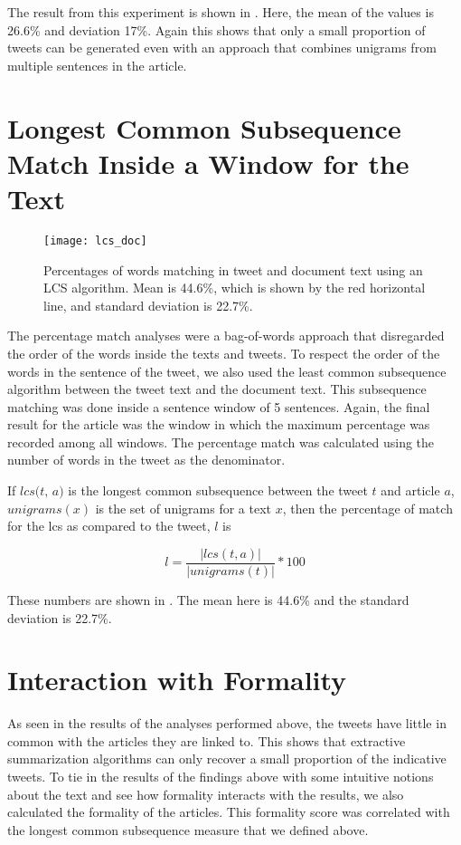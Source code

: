 The result from this experiment is shown in . Here, the mean of the values is 26.6\% and deviation 17\%. Again this shows that only a small proportion of tweets can be generated even with an approach that combines unigrams from multiple sentences in the article.


\section{Longest Common Subsequence Match Inside a Window for the Text}
\label{sec:lcs}

\begin{figure}[!htbp]
\centering
\texttt{[image: lcs\_doc]}
\caption[LCS match percentages]{Percentages of words matching in tweet and document text using an LCS algorithm. Mean is 44.6\%, which is shown by the red horizontal line, and standard deviation is 22.7\%.}
\label{fig:lcs}
\end{figure}

The percentage match analyses were a bag-of-words approach that disregarded the order of the words inside the texts and tweets. To respect the order of the words in the sentence of the tweet, we also used the least common subsequence algorithm between the tweet text and the document text. This subsequence matching was done inside a sentence window of 5 sentences. 
Again, the final result for the article was the window in which the maximum percentage was recorded among all windows. The percentage match was calculated using the number of words in the tweet as the denominator.

If $\textit{lcs(t, a)}$ is the longest common subsequence between the tweet $t$ and article $a$, $\textit{unigrams}(x)$ is the set of unigrams for a text $x$, then the percentage of match for the lcs as compared to the tweet, $\textit{l}$ is


\begin{equation}
l = \frac{| \textit{lcs}(t, a) |}{| \textit{unigrams}(t) |} * 100
\end{equation}


 These numbers are shown in . The mean here is 44.6\% and the standard deviation is 22.7\%. 

\section{Interaction with Formality}

As seen in the results of the analyses performed above, the tweets have little in common with the articles they are linked to. This shows that extractive summarization algorithms can only recover a small proportion of the indicative tweets. To tie in the results of the findings above with some intuitive notions about the text and see how formality interacts with the results, we also calculated the formality of the articles. This formality score was correlated with the longest common subsequence measure that we defined above. 

